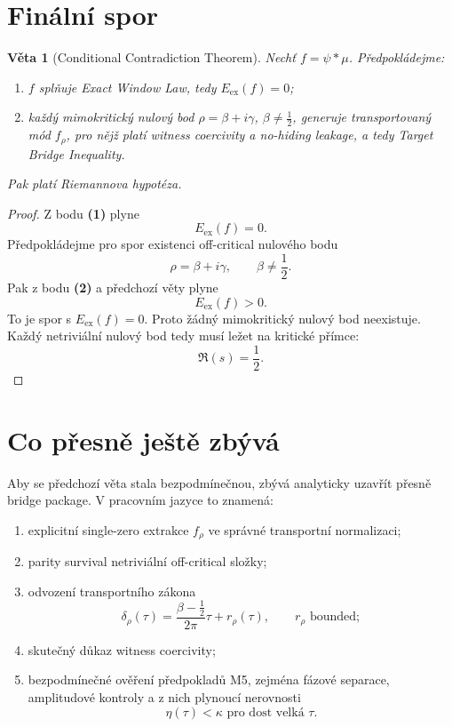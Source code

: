 \documentclass[11pt,a4paper]{article}
\newtheorem{theorem}{Věta}[section]
\begin{document}
\section{Finální spor}

\begin{theorem}[Conditional Contradiction Theorem]
Nechť \(f=\psi*\mu\). Předpokládejme:
\begin{enumerate}[label=\textbf{(\arabic*)}]
\item \(f\) splňuje Exact Window Law, tedy \(E_{\mathrm{ex}}(f)=0\);
\item každý mimokritický nulový bod \(\rho=\beta+i\gamma\), \(\beta\neq \frac12\), generuje
transportovaný mód \(f_\rho\), pro nějž platí witness coercivity a no-hiding leakage, a tedy
Target Bridge Inequality.
\end{enumerate}
Pak platí Riemannova hypotéza.
\end{theorem}

\begin{proof}
Z bodu \textbf{(1)} plyne
\[
E_{\mathrm{ex}}(f)=0.
\]
Předpokládejme pro spor existenci off-critical nulového bodu
\[
\rho=\beta+i\gamma,\qquad \beta\neq \frac12.
\]
Pak z bodu \textbf{(2)} a předchozí věty plyne
\[
E_{\mathrm{ex}}(f)>0.
\]
To je spor s \(E_{\mathrm{ex}}(f)=0\). Proto žádný mimokritický nulový bod neexistuje. Každý
netriviální nulový bod tedy musí ležet na kritické přímce:
\[
\Re(s)=\frac12.
\]
\end{proof}

\section{Co přesně ještě zbývá}

Aby se předchozí věta stala bezpodmínečnou, zbývá analyticky uzavřít přesně bridge package.
V pracovním jazyce to znamená:

\begin{enumerate}[label=\textbf{M\arabic*.}]
\item explicitní single-zero extrakce \(f_\rho\) ve správné transportní normalizaci;
\item parity survival netriviální off-critical složky;
\item odvození transportního zákona
\[
\delta_\rho(\tau)=\frac{\beta-\tfrac12}{2\pi}\tau+r_\rho(\tau),
\qquad r_\rho \text{ bounded};
\]
\item skutečný důkaz witness coercivity;
\item bezpodmínečné ověření předpokladů M5, zejména fázové separace, amplitudové kontroly a z nich plynoucí nerovnosti
\[
\eta(\tau)<\kappa \text{ pro dost velká }\tau.
\]
\end{enumerate}
\end{document}
